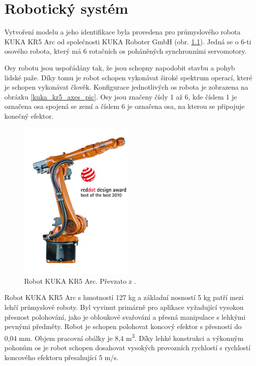 
\chapter{Robotický systém}

Vytvoření modelu a jeho identifikace byla provedena pro průmyslového robota KUKA KR5 Arc \cite{kuka_datasheet_url} od společnosti KUKA Roboter GmbH (obr. \ref{kuka_kr5_pic}). Jedná se o 6-ti osového robota, který má 6 rotačních os poháněných synchronními servomotory. 

Osy robotu jsou uspořádány tak, že jsou schopny napodobit stavbu a pohyb lidské paže. Díky tomu je robot schopen vykonávat široké spektrum operací, které je schopen vykonávat člověk. Konfigurace jednotlivých os robota je zobrazena na obrázku \ref{kuka_kr5_axes_pic}. Osy jsou značeny čísly 1 až 6, kde číslem 1 je označena osa spojená se zemí a číslem 6 je označena osa, na kterou se připojuje konečný efektor. 

\begin{figure}[ht]
\includegraphics[width=0.5\textwidth]{PR_KR5_arc_02}
\caption{Robot KUKA KR5 Arc. Převzato z \cite{kuka_datasheet_url}.}
\label{kuka_kr5_pic}
\end{figure}

Robot KUKA KR5 Arc s hmotností 127 kg a základní nosností 5 kg patří mezi lehčí průmyslové roboty. Byl vyvinut primárně pro aplikace vyžadující vysokou přesnost polohování, jako je obloukové svařování a přesná manipulace s lehkými pevnými předměty. Robot je schopen polohovat koncový efektor s přesností do 0,04 mm. Objem pracovní obálky je 8,4 \si{m^{3}}. Díky lehké konstrukci a výkonným pohonům os je robot schopen dosahovat vysokých provozních rychlostí s rychlostí koncového efektoru přesahující 5 \si{m/s}.  

